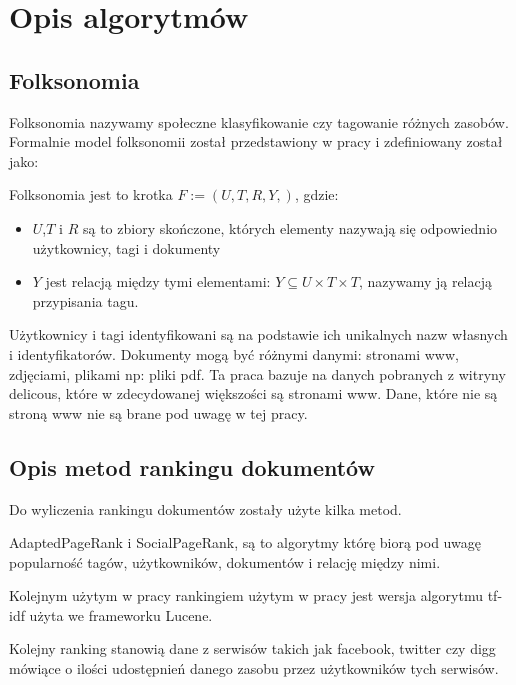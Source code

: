 \chapter{Opis algorytmów}


\section{Folksonomia}

Folksonomia nazywamy społeczne klasyfikowanie czy tagowanie różnych zasobów. Formalnie model folksonomii został przedstawiony w pracy \cite{hotho2006information} i zdefiniowany został jako: 

\begin{definicja}
Folksonomia jest to krotka $F := (U,T,R,Y, )$, gdzie:
\begin{itemize}
\item $U$,$T$ i $R$ są to zbiory skończone, których elementy nazywają się odpowiednio użytkownicy, tagi i dokumenty
\item $Y$ jest relacją między tymi elementami: $Y \subseteq  U \times T \times T $, nazywamy ją relacją przypisania tagu.

\end{itemize}
\end{definicja}

Użytkownicy i tagi identyfikowani są na podstawie ich unikalnych nazw własnych i identyfikatorów. Dokumenty mogą być różnymi danymi: stronami www, zdjęciami, plikami np: pliki pdf. Ta praca bazuje na danych pobranych z witryny delicous, które w zdecydowanej większości są stronami www. Dane, które nie są stroną www nie są brane pod uwagę w tej pracy. 

\section{Opis metod rankingu dokumentów}

Do wyliczenia rankingu dokumentów zostały użyte kilka metod. 

AdaptedPageRank i SocialPageRank, są to algorytmy którę biorą pod uwagę popularność tagów, użytkowników, dokumentów i relację między nimi. 

Kolejnym użytym w pracy rankingiem użytym w pracy jest wersja algorytmu tf-idf użyta we frameworku Lucene. 

Kolejny ranking stanowią dane z serwisów takich jak facebook, twitter czy digg mówiące o ilości udostępnień danego zasobu przez użytkowników tych serwisów. 








